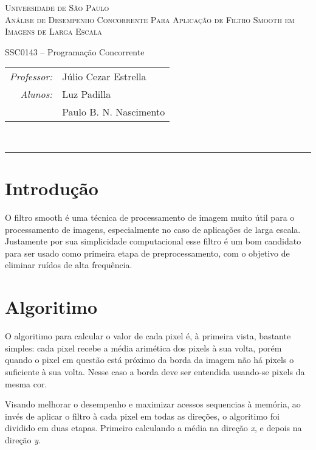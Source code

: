 \documentclass[11pt,towside]{article}
\begin{document}
\begin{titlepage}
\begin{center}

\textsc{\Huge Universidade de São Paulo}\\[5mm]
\textsc{\Large Análise de Desempenho Concorrente Para Aplicação de Filtro Smooth em Imagens de Larga Escala}

\vfill
{\Huge SSC0143 -- Programação Concorrente}
\vfill

\begin{tabular}{rl}
\emph{Professor:}& {\Large Júlio Cezar Estrella} \\[5mm]
\emph{Alunos:}& {\Large Luz Padilla} \\[2mm]
& {\Large Paulo B. N. Nascimento}
\end{tabular}\\[25mm]

\end{center}
\end{titlepage}

\tableofcontents
\vspace{1cm}
\hrule
\vspace{1cm}

\section{Introdução}
O filtro smooth é uma técnica de processamento de imagem muito útil para o processamento de imagens, especialmente no caso de aplicações de larga escala. Justamente por sua simplicidade computacional esse filtro é um bom candidato para ser usado como primeira etapa de preprocessamento, com o objetivo de eliminar ruídos de alta frequência.


\section{Algoritimo}
O algoritimo para calcular o valor de cada pixel é, à primeira vista, bastante simples: cada pixel recebe a média arimética dos pixels à sua volta, porém quando o pixel em questão está próximo da borda da imagem não há pixels o suficiente à sua volta. Nesse caso a borda deve ser entendida usando-se pixels da mesma cor.

Visando melhorar o desempenho e maximizar acessos sequencias à memória, ao invés de aplicar o filtro à cada pixel em todas as direções, o algoritimo foi dividido em duas etapas. Primeiro calculando a média na direção \emph{x}, e depois na direção \emph{y}.
\end{document}
